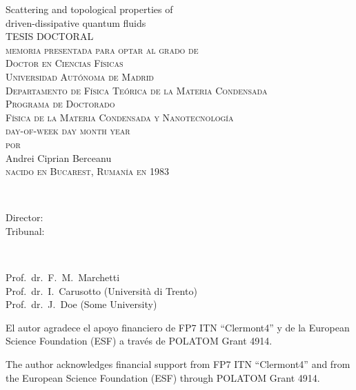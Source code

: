 \thispagestyle{empty}

\begin{center}
{\Huge  Scattering and topological properties of \\ driven-dissipative quantum fluids\\}
\vspace{5.4cm}
{\large{TESIS DOCTORAL}}\\
\vspace{2.6cm}
{ \textsc{memoria presentada para optar al grado de \\ Doctor en Ciencias F\'{i}sicas\\
Universidad Aut\'{o}noma de Madrid\\
Departamento de F\'{i}sica Te\'{o}rica de la Materia Condensada\\
Programa de Doctorado\\
F\'{i}sica de la Materia Condensada y Nanotecnolog\'{i}a\\
day-of-week day month year\\ %
$\,$\\$\,$\\por\\$\,$\\$\,$\\}
{\LARGE{Andrei Ciprian Berceanu}}\\$\,$ \\\textsc{nacido en Bucarest, Ruman\'{i}a en 1983}}
\end{center}
\newpage

\thispagestyle{empty}
\\[2ex]
  \parbox[t]{2.8cm}{Director:\\
                  Tribunal:
}~\parbox[t]{9cm}{Prof.\ dr.\ F.\ M.\ Marchetti \\
Prof.\ dr.\ I.\ Carusotto (Universit\`{a} di Trento) \\
Prof.\ dr.\ J.\ Doe (Some University)
}


\vfill


\noindent
\begin{otherlanguage}{spanish}
El autor agradece el apoyo financiero de FP7 ITN ``Clermont4'' y
de la European Science Foundation (ESF) a trav\'{e}s de POLATOM Grant 4914.
\end{otherlanguage}
\vspace{\baselineskip}


\noindent
The author acknowledges financial support from FP7 ITN ``Clermont4'' and
from the European Science Foundation (ESF) through POLATOM Grant 4914.
\vspace{\baselineskip}


